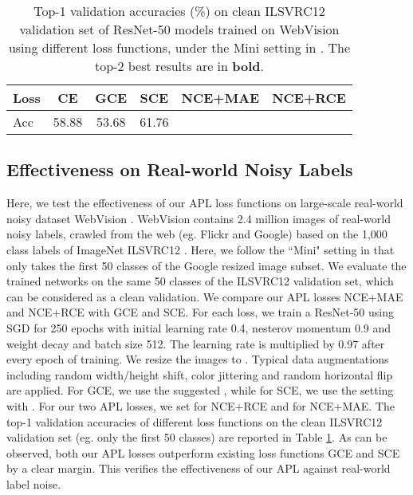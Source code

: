 \documentclass{article}
\begin{document}
\begin{table}[h]
\centering
\small
\caption{Top-1 validation accuracies (\%) on clean ILSVRC12 validation set of ResNet-50 models trained on WebVision using different loss functions, under the Mini setting in \cite{jiang2018mentornet}. The top-2 best results are in \textbf{bold}.}

\label{tab:webvision}
\begin{adjustbox}{width=0.49\textwidth}
\begin{tabular}{l|ccccc}
\hline
Loss & CE & GCE & SCE & \textbf{NCE+MAE} & \textbf{NCE+RCE}\\ \hline
Acc & 58.88 & 53.68 &  61.76 &  & \\

\hline
\end{tabular}
\end{adjustbox}
\vspace{-0.1 in}
\end{table}

\subsection{Effectiveness on Real-world Noisy Labels}\label{sec:webvision}
Here, we test the effectiveness of our APL loss functions on large-scale real-world noisy dataset WebVision \cite{li2017webvision}. WebVision contains 2.4 million images of real-world noisy labels, crawled from the web (eg. Flickr and Google) based on the 1,000 class labels of ImageNet ILSVRC12 \cite{deng2009imagenet}. Here, we follow the ``Mini" setting in \cite{jiang2018mentornet} that only takes the first 50 classes of the Google resized image subset. We evaluate the trained networks on the same 50 classes of the ILSVRC12 validation set, which can be considered as a clean validation.
We compare our APL losses NCE+MAE and NCE+RCE with GCE and SCE. 
For each loss, we train a ResNet-50 \cite{he2016deep} using SGD for 250 epochs with initial learning rate 0.4, nesterov momentum 0.9 and weight decay  and batch size 512. The learning rate is multiplied by 0.97 after every epoch of training. 
We resize the images to . Typical data augmentations including random width/height shift, color jittering and random horizontal flip are applied. For GCE, we use the suggested , while for SCE, we use the setting with . For our two APL losses, we set  for NCE+RCE and  for NCE+MAE.
The top-1 validation accuracies of different loss functions on the clean ILSVRC12 validation set (eg. only the first 50 classes) are reported in Table \ref{tab:webvision}. As can be observed, both our APL losses outperform existing loss functions GCE and SCE by a clear margin. This verifies the effectiveness of our APL against real-world label noise.
\end{document}
